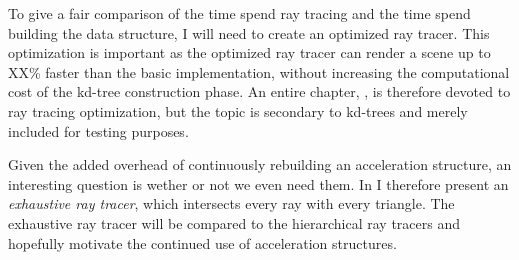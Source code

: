To give a fair comparison of the time spend ray tracing and the time
spend building the data structure, I will need to create an optimized
ray tracer. This optimization is important as the optimized ray tracer
can render a scene up to XX\% faster than the basic implementation,
without increasing the computational cost of the kd-tree construction
phase. An entire chapter, , is therefore
devoted to ray tracing optimization, but the topic is secondary to
kd-trees and merely included for testing purposes.

Given the added overhead of continuously rebuilding an acceleration
structure, an interesting question is wether or not we even need
them. In  I therefore present an
\textit{exhaustive ray tracer}, which intersects every ray with every
triangle. The exhaustive ray tracer will be compared to the
hierarchical ray tracers and hopefully motivate the continued use of
acceleration structures.




